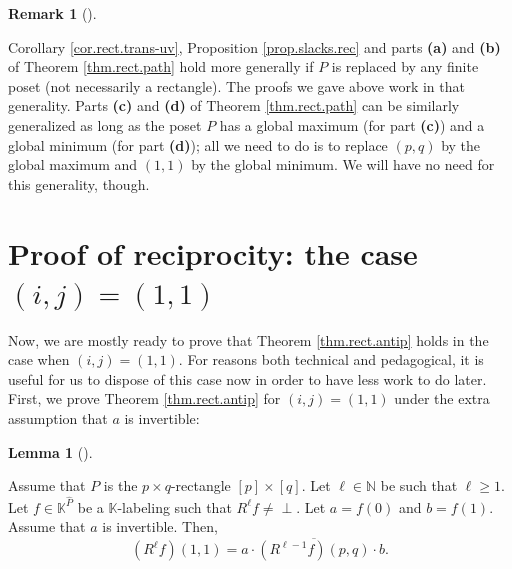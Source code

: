 \documentclass[numbers=enddot,12pt,final,onecolumn,notitlepage]{scrartcl}%
\theoremstyle{definition}
\newtheorem{lem}[theo]{Lemma}
\newenvironment{lemma}[1][]
{\begin{lem}[#1]\begin{leftbar}}
{\end{leftbar}\end{lem}}
\newtheorem{remk}[theo]{Remark}
\newenvironment{remark}[1][]
{\begin{remk}[#1]\begin{leftbar}}
{\end{leftbar}\end{remk}}
\newcommand{\undf}{\operatorname*{\bot}}
\begin{document}
\begin{remark}
\label{rmk.slacks.gen} Corollary \ref{cor.rect.trans-uv}, Proposition
\ref{prop.slacks.rec} and parts \textbf{(a)} and \textbf{(b)} of Theorem
\ref{thm.rect.path} hold more generally if $P$ is replaced by any finite poset
(not necessarily a rectangle). The proofs we gave above work in that
generality. Parts \textbf{(c)} and \textbf{(d)} of Theorem \ref{thm.rect.path}
can be similarly generalized as long as the poset $P$ has a global maximum
(for part \textbf{(c)}) and a global minimum (for part \textbf{(d)}); all we
need to do is to replace $\left(  p,q\right)  $ by the global maximum and
$\left(  1,1\right)  $ by the global minimum. We will have no need for this
generality, though.
\end{remark}

\section{\label{sec.ij=11}Proof of reciprocity: the case $\left(  i,j\right)
=\left(  1,1\right)  $}

Now, we are mostly ready to prove that Theorem \ref{thm.rect.antip} holds in
the case when $\left(  i,j\right)  =\left(  1,1\right)  $. For reasons both
technical and pedagogical, it is useful for us to dispose of this case now in
order to have less work to do later. First, we prove Theorem
\ref{thm.rect.antip} for $\left(  i,j\right)  =\left(  1,1\right)  $ under the
extra assumption that $a$ is invertible:

\begin{lemma}
\label{lem.rect.antip.11inv}Assume that $P$ is the $p\times q$-rectangle
$\left[  p\right]  \times\left[  q\right]  $. Let $\ell\in\mathbb{N}$ be such
that $\ell\geq1$. Let $f\in\mathbb{K}^{\widehat{P}}$ be a $\mathbb{K}%
$-labeling such that $R^{\ell}f\neq\undf$. Let $a=f\left(  0\right)  $ and
$b=f\left(  1\right)  $. Assume that $a$ is invertible. Then,%
\[
\left(  R^{\ell}f\right)  \left(  1,1\right)  =a\cdot\overline{\left(
R^{\ell-1}f\right)  \left(  p,q\right)  }\cdot b.
\]

\end{lemma}
\end{document}
